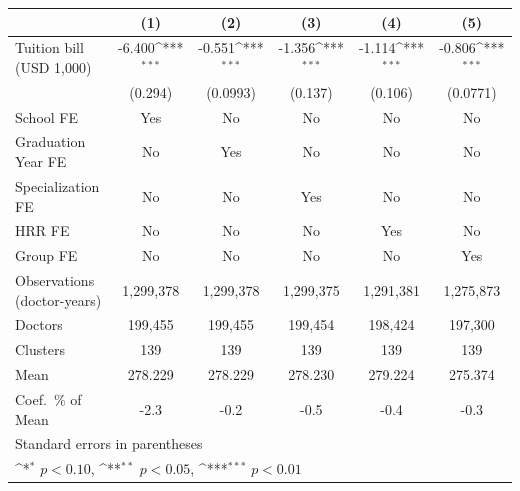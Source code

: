 {
\def\sym#1{\ifmmode^{#1}\else\(^{#1}\)\fi}
\begin{tabular}{l*{5}{c}}
\hline\hline
                    &\multicolumn{1}{c}{(1)}         &\multicolumn{1}{c}{(2)}         &\multicolumn{1}{c}{(3)}         &\multicolumn{1}{c}{(4)}         &\multicolumn{1}{c}{(5)}         \\
\hline
Tuition bill (USD 1,000)&      -6.400\sym{***}&      -0.551\sym{***}&      -1.356\sym{***}&      -1.114\sym{***}&      -0.806\sym{***}\\
                    &     (0.294)         &    (0.0993)         &     (0.137)         &     (0.106)         &    (0.0771)         \\
[1em]
School FE           &         Yes         &          No         &          No         &          No         &          No         \\
[1em]
Graduation Year FE  &          No         &         Yes         &          No         &          No         &          No         \\
[1em]
Specialization FE   &          No         &          No         &         Yes         &          No         &          No         \\
[1em]
HRR FE              &          No         &          No         &          No         &         Yes         &          No         \\
[1em]
Group FE            &          No         &          No         &          No         &          No         &         Yes         \\
\hline
Observations (doctor-years)&   1,299,378         &   1,299,378         &   1,299,375         &   1,291,381         &   1,275,873         \\
Doctors             &     199,455         &     199,455         &     199,454         &     198,424         &     197,300         \\
Clusters            &         139         &         139         &         139         &         139         &         139         \\
Mean                &     278.229         &     278.229         &     278.230         &     279.224         &     275.374         \\
Coef.\ \% of Mean   &        -2.3         &        -0.2         &        -0.5         &        -0.4         &        -0.3         \\
\hline\hline
\multicolumn{6}{l}{\footnotesize Standard errors in parentheses}\\
\multicolumn{6}{l}{\footnotesize \sym{*} \(p<0.10\), \sym{**} \(p<0.05\), \sym{***} \(p<0.01\)}\\
\end{tabular}
}
